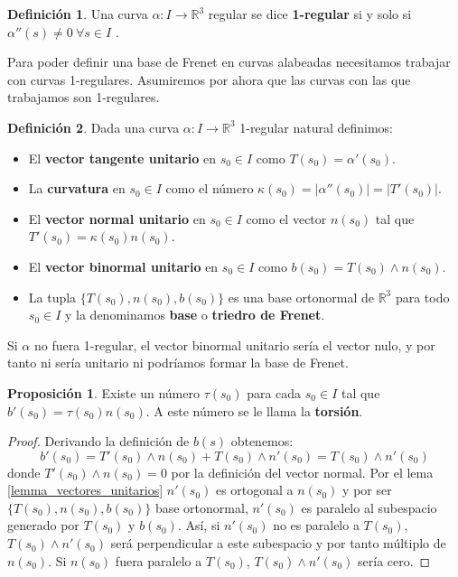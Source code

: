 \documentclass{article}
\theoremstyle{definition}
\newtheorem{prop}{Proposición}
\newtheorem{define}{Definición}
\newcommand{\reales}{\mathbb{R}}
\begin{document}
\begin{define}
	Una curva $\alpha : I \rightarrow \reales^3$ regular se dice \textbf{1-regular} si y solo si $\alpha''(s)\neq 0\ \forall s \in I$ .
\end{define}

Para poder definir una base de Frenet en curvas alabeadas necesitamos trabajar con curvas 1-regulares. Asumiremos por ahora que las curvas con las que trabajamos son 1-regulares.

\begin{define}
	Dada una curva $\alpha : I \rightarrow \reales^3$ 1-regular natural definimos:
	\begin{itemize}
		\item
		El \textbf{vector tangente unitario} en $s_0 \in I$ como $T(s_0) = \alpha'(s_0)$.
		\item
		La \textbf{curvatura} en $s_0 \in I$ como el número $\kappa(s_0) = |\alpha''(s_0)| = |T'(s_0)|$.
		\item
		El \textbf{vector normal unitario} en $s_0 \in I$ como el vector $n(s_0)$ tal que $T'(s_0) = \kappa(s_0)n(s_0)$.
		\item
		El \textbf{vector binormal unitario} en $s_0 \in I$ como $b(s_0) = T(s_0) \wedge n(s_0)$.
		\item
		La tupla $\{T(s_0), n(s_0), b(s_0)\}$ es una base ortonormal de $\reales^3$ para todo $s_0 \in I$ y la denominamos \textbf{base} o \textbf{triedro de Frenet}.
	\end{itemize}
\end{define}

Si $\alpha$ no fuera 1-regular, el vector binormal unitario sería el vector nulo, y por tanto ni sería unitario ni podríamos formar la base de Frenet.

\begin{prop}
	Existe un número $\tau(s_0)$ para cada $s_0 \in I$ tal que $b'(s_0) = \tau(s_0)n(s_0)$. A este número se le llama la \textbf{torsión}.
\end{prop}

\begin{proof}
	Derivando la definición de $b(s)$ obtenemos:
	\begin{equation*}
		b'(s_0) = T'(s_0) \wedge n(s_0) + T(s_0) \wedge n'(s_0) = T(s_0) \wedge n'(s_0)
	\end{equation*}
	donde $T'(s_0) \wedge n(s_0) = 0$ por la definición del vector normal. Por el lema \eqref{lemma_vectores_unitarios} $n'(s_0)$ es ortogonal a $n(s_0)$ y por ser $\{T(s_0), n(s_0), b(s_0)\}$ base ortonormal, $n'(s_0)$ es paralelo al subespacio generado por $T(s_0)$ y $b(s_0)$. Así, si $n'(s_0)$ no es paralelo a $T(s_0)$, $T(s_0) \wedge n'(s_0)$ será perpendicular a este subespacio y por tanto múltiplo de $n(s_0)$. Si $n(s_0)$ fuera paralelo a $T(s_0)$, $T(s_0) \wedge n'(s_0)$ sería cero.
\end{proof}
\end{document}
